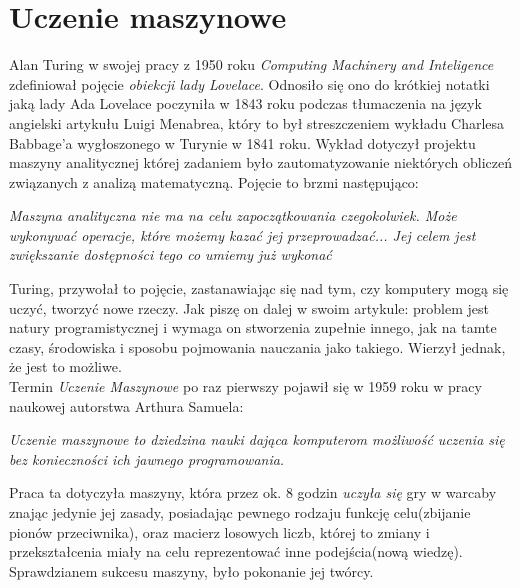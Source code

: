 \chapter{Uczenie maszynowe}

Alan Turing w swojej pracy z 1950 roku \textit{Computing Machinery and Inteligence}\cite{turing} zdefiniował pojęcie \textit{obiekcji lady Lovelace}. Odnosiło się ono do krótkiej notatki\cite{lovelace} jaką lady Ada Lovelace poczyniła w 1843 roku podczas tłumaczenia na język angielski artykułu Luigi Menabrea\cite{menabrea}, który to był streszczeniem wykładu Charlesa Babbage'a wygłoszonego w Turynie w 1841 roku. Wykład dotyczył projektu maszyny analitycznej której zadaniem było zautomatyzowanie niektórych obliczeń związanych z analizą matematyczną. Pojęcie to brzmi następująco:
\begin{center}
	\textit{Maszyna analityczna nie ma na celu zapoczątkowania czegokolwiek. Może wykonywać operacje, które możemy kazać jej przeprowadzać... Jej celem jest zwiększanie dostępności tego co umiemy już wykonać}\cite{turing}
\end{center}
Turing, przywołał to pojęcie, zastanawiając się nad tym, czy komputery mogą się uczyć, tworzyć nowe rzeczy. Jak piszę on dalej w swoim artykule\cite{turing}: problem jest natury programistycznej i wymaga on stworzenia zupełnie innego, jak na tamte czasy, środowiska i sposobu pojmowania nauczania jako takiego. Wierzył jednak, że jest to możliwe.
\\

Termin \textit{Uczenie Maszynowe} po raz pierwszy pojawił się w 1959 roku w pracy naukowej autorstwa Arthura Samuela:
\begin{center}
	\textit{Uczenie maszynowe to dziedzina nauki dająca komputerom możliwość uczenia się bez konieczności ich jawnego programowania.}\cite{samuel}
\end{center}
Praca  ta dotyczyła maszyny, która przez ok. 8 godzin \textit{uczyła się} gry w warcaby znając jedynie jej zasady, posiadając pewnego rodzaju funkcję celu(zbijanie pionów przeciwnika), oraz macierz losowych liczb, której to zmiany i przekształcenia miały na celu reprezentować inne podejścia(nową wiedzę). Sprawdzianem sukcesu maszyny, było pokonanie jej twórcy.
\\

